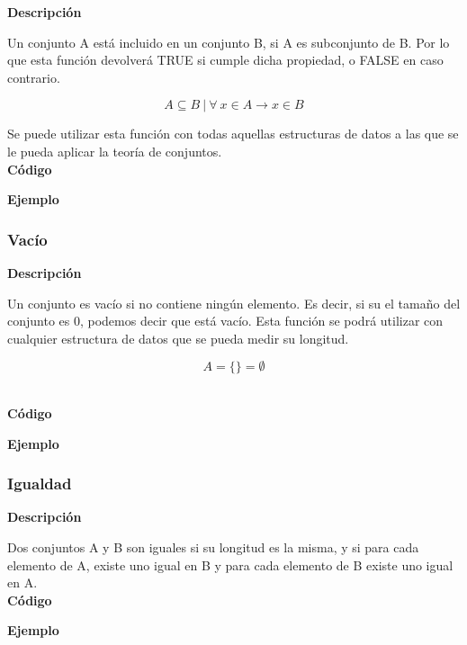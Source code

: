     \textbf{Descripci\'on}

    Un conjunto A est\'a incluido en un conjunto B, si A es subconjunto de B. Por lo que esta funci\'on 
    devolver\'a TRUE si cumple dicha propiedad, o FALSE en caso contrario.

    \[
    A \subseteq B ~ | ~  \forall ~ x \in A \to x \in B 
    \]

    Se puede utilizar esta funci\'on con todas aquellas estructuras de datos a las que se le pueda aplicar 
    la teor\'ia de conjuntos.
    \\


    \textbf{C\'odigo}

    


    \textbf{Ejemplo}


\subsubsection{Vac\'io}

    \textbf{Descripci\'on}

    Un conjunto es vac\'io si no contiene ning\'un elemento. Es decir, si su el tama\~no del conjunto es 0, 
    podemos decir que est\'a vac\'io. Esta funci\'on se podr\'a utilizar con cualquier estructura de datos 
    que se pueda medir su longitud.

    \[
    A = \{ \} = \emptyset
    \]

    \\


    \textbf{C\'odigo}

    

    \textbf{Ejemplo}


\subsubsection{Igualdad}

    \textbf{Descripci\'on}

    Dos conjuntos A y B son iguales si su longitud es la misma, y si para cada elemento de A, existe uno igual 
    en B y para cada elemento de B existe uno igual en A.
    \\


    \textbf{C\'odigo}

    


    \textbf{Ejemplo}



